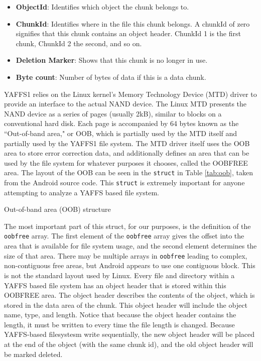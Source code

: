 \begin{itemize}
	\item {\bf ObjectId}: Identifies which object the chunk belongs to.\
	\item {\bf ChunkId}: Identifies where in the file this chunk belongs. 
		A chunkId of zero signifies that this chunk contains an object header. 
		ChunkId 1 is the first chunk, ChunkId 2 the second, and so on.
	\item {\bf Deletion Marker}: Shows that this chunk is no longer in use.
	\item {\bf Byte count}: Number of bytes of data if this is a data chunk.
\end{itemize}
\cite{howyaffsworks}

YAFFS1 relies on the Linux kernel's Memory Technology Device (MTD) driver to provide an interface to the actual NAND device.  The
Linux MTD presents the NAND device as a series of pages (usually 2kB), similar to blocks on a conventional hard disk.  Each page is
accompanied by 64 bytes known as the ``Out-of-band area," or OOB, which is partially used by the MTD itself and partially used by
the YAFFS1 file system. The MTD driver itself uses the OOB area to store error correction data, and additionally defines an area that
can be used by the file system for whatever purposes it chooses, called the OOBFREE area.  The layout of the OOB can be seen in the
\texttt{struct} in Table \ref{tab:oob}, taken from the Android source code. This \texttt{struct} is extremely important for anyone
attempting to analyze a YAFFS based file system.

\begin{table}[htb]

\caption{Out-of-band area (OOB) structure}
\label{tab:oob}
\end{table}

The most important part of this struct, for our purposes, is the definition of the \texttt{oobfree} array.  The first element of the
\texttt{oobfree} array gives the offset into the area that is available for file system usage, and the second element determines the
size of that area.  There may be multiple arrays in \texttt{oobfree} leading to complex, non-contiguous free areas, but Android
appears to use one contiguous block.  This is not the standard layout used by Linux. Every file and directory within a YAFFS based
file system has an object header that is stored within this OOBFREE area. The object header describes the contents of the object,
which is stored in the data area of the chunk. This object header will include the object name, type, and length.  Notice that
because the object header contains the length, it must be written to every time the file length is changed.  Because YAFFS-based
filesystesm write sequentially, the new object header will be placed at the end of the object (with the same chunk id), and the old
object header will be marked deleted. 

